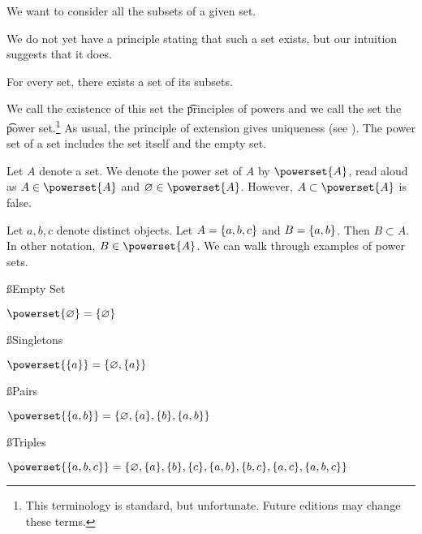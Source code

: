 

We want to consider all the subsets of a given set.


We do not yet have a principle stating that such a set exists, but our intuition suggests that it does.

\begin{principle}[Powers]
  For every set, there exists a set of its subsets.
\end{principle}

We call the existence of this set the \t{principles of powers} and we call the set the \t{power set}.\footnote{This terminology is standard, but unfortunate. Future editions may change these terms.}
As usual, the principle of extension gives uniqueness (see ).
The power set of a set includes the set itself and the empty set.


Let $A$ denote a set.
We denote the power set of $A$ by $\powerset{A}$, read aloud as 
$A \in \powerset{A}$ and $\emptyset \in \powerset{A}$.
However, $A \subset \powerset{A}$ is false.


Let $a, b, c$ denote distinct objects. Let $A = \{a, b ,c\}$
and $B = \{a, b\}$. Then
$B \subset A$.
In other notation,
$B \in \powerset{A}$.
We can walk through examples of power sets.

\ss{Empty Set}

\begin{proposition}
  $\powerset{\emptyset} = \set{\emptyset}$
\end{proposition}

\ss{Singletons}

\begin{proposition}
  $\powerset{\set{a}} = \set{\emptyset, \set{a}}$
\end{proposition}

\ss{Pairs}

\begin{proposition}
  $\powerset{\set{a, b}} = \set{\emptyset, \set{a}, \set{b}, \set{a, b}}$
\end{proposition}

\ss{Triples}

\begin{proposition}
  $\powerset{\set{a, b, c}} =
  \{
    \emptyset,
    \set{a},
    \set{b},
    \set{c},
    \set{a, b},
    \set{b, c},
    \set{a, c},
    \set{a, b, c}
  \}$
\end{proposition}

